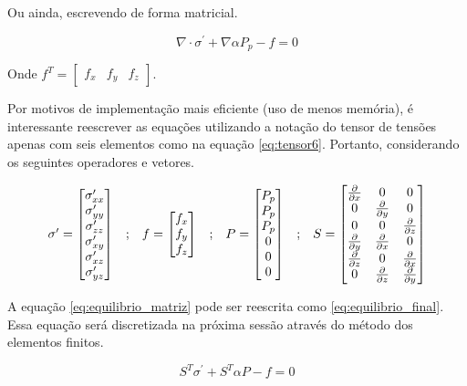 Ou ainda, escrevendo de forma matricial. 

\begin{equation}
\label{eq:equilibrio_matriz}
\nabla \cdot \sigma^\prime + \nabla \alpha P_p - f = 0
\end{equation}

Onde $f^T=\begin{bmatrix}f_x & f_y & f_z\end{bmatrix}$.


Por motivos de implementação mais eficiente (uso de menos memória), é interessante reescrever as equações utilizando a notação do tensor de tensões apenas com seis elementos como na equação \ref{eq:tensor6}. Portanto, considerando os seguintes operadores e vetores.

\begin{equation}
\begin{matrix}
\sigma^\prime = \begin{bmatrix}
\sigma^\prime_{xx}
\\
\sigma^\prime_{yy}
\\
\sigma^\prime_{zz}
\\
\sigma^\prime_{xy}
\\
\sigma^\prime_{xz}
\\
\sigma^\prime_{yz}
\end{bmatrix}
&

;

&

f = \begin{bmatrix}
f_{x}
\\
f_{y}
\\
f_{z}
\end{bmatrix}
&
;
&

P = \begin{bmatrix} P_p \\ P_p \\ P_p \\0 \\ 0 \\ 0\end{bmatrix}

&
;

&
S = \begin{bmatrix} \frac{\partial { }}{\partial x} & 0 & 0 \\ 0 & \frac{\partial { }}{\partial y} & 0 \\ 0 & 0 & \frac{\partial { }}{\partial z} \\ \frac{\partial { }}{\partial y} & \frac{\partial { }}{\partial x} & 0 \\ \frac{\partial { }}{\partial z} & 0 & \frac{\partial { }}{\partial x} \\ 0 & \frac{\partial { }}{\partial z} & \frac{\partial { }}{\partial y} \end{bmatrix}
\end{matrix}
\end{equation}

A equação \ref{eq:equilibrio_matriz} pode ser reescrita como \ref{eq:equilibrio_final}. Essa equação será discretizada na próxima sessão através do método dos elementos finitos.

\begin{equation}
\label{eq:equilibrio_final}
S^T\sigma^\prime + S^T\alpha P - f = 0
\end{equation}


